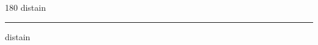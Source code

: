 
\begin{frame}
\begin{center}
\begin{turn}{180}
{\fontsize{2.5cm}{1em}\selectfont distain}
\end{turn}
\vspace{1em}\par  
\hrule
\vspace{1em}\par  
{\fontsize{2.5cm}{1em}\selectfont distain}
\end{center}
\end{frame}
